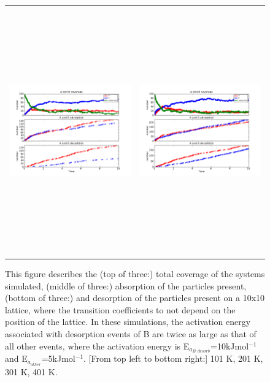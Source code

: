\documentclass[11pt]{article}
\begin{document}
\begin{figure}[h!]
\begin{tabular}{cc}
\includegraphics[width=3.5in, height=4.2in]{./coadsorb/AtoBcoadsorb10x10_301_Bdes2x__EA5E3_EBx10E3_1.png} &
\includegraphics[width=3.5in, height=4.2in]{./coadsorb/AtoBcoadsorb10x10_401_Bdes2x__EA5E3_EBx10E3_1.png} 
\end{tabular}
\caption{This figure describes the (top of three:) total coverage of the systems simulated, (middle of three:) absorption of the particles present, (bottom of three:) and desorption of the particles present on a 10x10 lattice, where the transition coefficients to not depend on the position of the lattice. In these simulations, the activation energy associated with desorption events of B are twice as large as that of all other events, where the activation energy is E$_{a_{B:desorb}}$=10kJmol$^{-1}$ and E$_{a_{other}}$=5kJmol$^{-1}$. [From top left to bottom right:] 101 K, 201 K, 301 K, 401 K.}
\end{figure}
\end{document}
